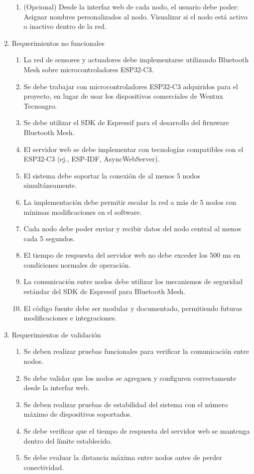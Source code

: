 \documentclass[
11pt, %
]{charter}
\begin{document}
\begin{enumerate}
\begin{enumerate}
		\item (Opcional) Desde la interfaz web de cada nodo, el usuario debe poder:
		\subitem Asignar nombres personalizados al nodo.
		\subitem Visualizar si el nodo está activo o inactivo dentro de la red.
	\end{enumerate}
	
\item Requerimientos no funcionales
	\begin{enumerate}
		\item La red de sensores y actuadores debe implementarse utilizando Bluetooth Mesh sobre microcontroladores ESP32-C3.
		\item Se debe trabajar con microcontroladores ESP32-C3 adquiridos para el proyecto, en lugar de usar los dispositivos comerciales de Wentux Tecnoagro.
		\item Se debe utilizar el SDK de Espressif para el desarrollo del firmware Bluetooth Mesh.
		\item El servidor web se debe implementar con tecnologías compatibles con el ESP32-C3 (ej., ESP-IDF, AsyncWebServer). %
		\item El sistema debe soportar la conexión de al menos 5 nodos simultáneamente.
		\item La implementación debe permitir escalar la red a más de 5 nodos con mínimas modificaciones en el software.
		\item Cada nodo debe poder enviar y recibir datos del nodo central al menos cada 5 segundos.		
		\item El tiempo de respuesta del servidor web no debe exceder los 500 ms en condiciones normales de operación.
		\item La comunicación entre nodos debe utilizar los mecanismos de seguridad estándar del SDK de Espressif para Bluetooth Mesh.
		\item El código fuente debe ser modular y documentado, permitiendo futuras modificaciones e integraciones.
	\end{enumerate}
	
\item Requerimientos de validación
	\begin{enumerate}
		\item Se deben realizar pruebas funcionales para verificar la comunicación entre nodos.
		\item Se debe validar que los nodos se agreguen y configuren correctamente desde la interfaz web.
		\item Se deben realizar pruebas de estabilidad del sistema con el número máximo de dispositivos soportados.
		\item Se debe verificar que el tiempo de respuesta del servidor web se mantenga dentro del límite establecido.
		\item Se debe evaluar la distancia máxima entre nodos antes de perder conectividad.
	\end{enumerate}


\end{enumerate}
\end{document}
